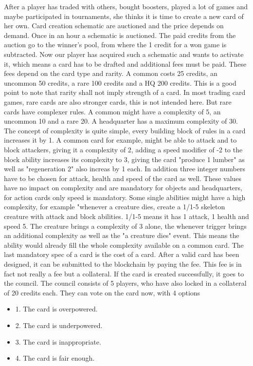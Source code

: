 \documentclass{article}
\begin{document}
After a player has traded with others, bought boosters, played a lot of games and maybe participated in tournaments, she thinks it is time to create a new card of her own. Card creation schematic are auctioned and the price depends on demand. Once in an hour a schematic is auctioned. The paid credits from the auction go to the winner's pool, from where the 1 credit for a won game is subtracted. Now our player has acquired such a schematic and wants to activate it, which means a card has to be drafted and additional fees must be paid. These fees depend on the card type and rarity. A common costs 25 credits, an uncommon 50 credits, a rare 100 credits and a HQ 200 credits. This is a good point to note that rarity shall not imply strength of a card. In most trading card games, rare cards are also stronger cards, this is not intended here. But rare cards have complexer rules. A common might have a complexity of 5, an uncommon 10 and a rare 20. A headquarter has a maximum complexity of 30. The concept of complexity is quite simple, every building block of rules in a card increases it by 1. A common card for example, might be able to attack and to block attackers, giving it a complexity of 2, adding a speed modifier of -2 to the block ability increases its complexity to 3, giving the card "produce 1 lumber" as well as "regeneration 2" also increas by 1 each. In addition three integer numbers have to be chosen for attack, health and speed of the card as well. These values have no impact on complexity and are mandatory for objects and headquarters, for action cards only speed is mandatory. Some single abilities might have a high complexity, for example "whenever a creature dies, create a 1/1-5 skeleton creature with attack and block abilities. 1/1-5 means it has 1 attack, 1 health and speed 5. The creature brings a complexity of 3 alone, the whenever trigger brings an additional complexity as well as the "a creature dies" event. This means the ability would already fill the whole complexity available on a common card. The last mandatory spec of a card is the cost of a card. After a valid card has been designed, it can be submitted to the blockchain by paying the fee. This fee is in fact not really a fee but a collateral. If the card is created successfully, it goes to the council. The council consists of 5 players, who have also locked in a collateral of 20 credits each. They can vote on the card now, with 4 options
%
\begin{itemize}
	\item 1. The card is overpowered.
	\item 2. The card is underpowered.
	\item 3. The card is inappropriate. 
	\item 4. The card is fair enough.
\end{itemize}
\end{document}
